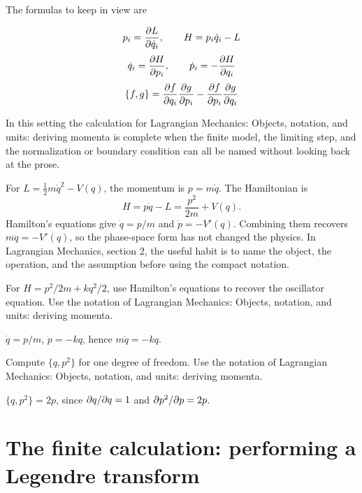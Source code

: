 The formulas to keep in view are

\[
  p_i=\frac{\partial L}{\partial\dot q_i},\qquad H=p_i\dot q_i-L
\]
\[
  \dot q_i=\frac{\partial H}{\partial p_i},\qquad \dot p_i=-\frac{\partial H}{\partial q_i}
\]
\[
  \{f,g\}=\frac{\partial f}{\partial q_i}\frac{\partial g}{\partial p_i}-\frac{\partial f}{\partial p_i}\frac{\partial g}{\partial q_i}
\]

In this setting the calculation for Lagrangian Mechanics: Objects, notation, and units: deriving momenta is complete when the finite model, the limiting step, and the normalization or boundary condition can all be named without looking back at the prose.




\begin{example}
For \(L=\frac12m\dot q^2-V(q)\), the momentum is \(p=m\dot q\).  The Hamiltonian is
\[
  H=p\dot q-L=\frac{p^2}{2m}+V(q).
\]
Hamilton's equations give \(\dot q=p/m\) and \(\dot p=-V'(q)\).  Combining them recovers \(m\ddot q=-V'(q)\), so the phase-space form has not changed the physics.  In Lagrangian Mechanics, section 2, the useful habit is to name the object, the operation, and the assumption before using the compact notation.
\end{example}



\begin{exercise}
For \(H=p^2/2m+kq^2/2\), use Hamilton's equations to recover the oscillator equation.  Use the notation of Lagrangian Mechanics: Objects, notation, and units: deriving momenta.
\begin{answer}
\(\dot q=p/m\), \(\dot p=-kq\), hence \(m\ddot q=-kq\).
\end{answer}
\end{exercise}

\begin{exercise}
Compute \(\{q,p^2\}\) for one degree of freedom.  Use the notation of Lagrangian Mechanics: Objects, notation, and units: deriving momenta.
\begin{answer}
\(\{q,p^2\}=2p\), since \(\partial q/\partial q=1\) and \(\partial p^2/\partial p=2p\).
\end{answer}
\end{exercise}



\section{The finite calculation: performing a Legendre transform}

